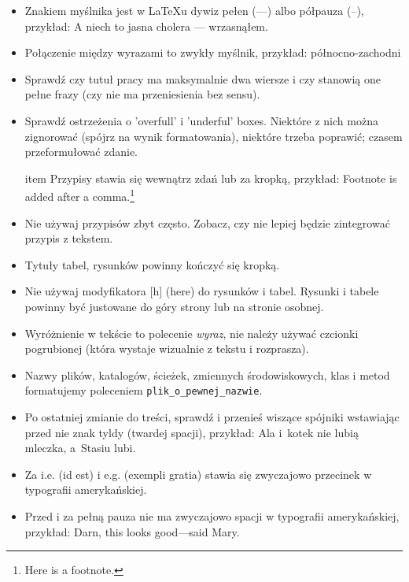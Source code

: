 \begin{itemize}
    \item Znakiem myślnika jest w LaTeXu dywiz pełen (---) albo półpauza (--), przykład:
    A niech to jasna cholera --- wrzasnąłem.

    \item Połączenie między wyrazami to zwykły myślnik, przykład:   północno-zachodni

    \item Sprawdź czy tutuł pracy ma maksymalnie dwa wiersze i czy stanowią one pełne frazy
    (czy nie ma przeniesienia bez sensu).

    \item Sprawdź ostrzeżenia o 'overfull' i 'underful' boxes. Niektóre z nich można zignorować (spójrz
    na wynik formatowania), niektóre trzeba poprawić; czasem przeformułować zdanie.

    item Przypisy stawia się wewnątrz zdań lub za kropką, przykład:
    Footnote is added after a comma.\footnote{Here is a footnote.}

    \item Nie używaj przypisów zbyt często. Zobacz, czy nie lepiej będzie zintegrować przypis z tekstem.

    \item Tytuły tabel, rysunków powinny kończyć się kropką.

    \item Nie używaj modyfikatora [h] (here) do rysunków i tabel. Rysunki i tabele powinny być
    justowane do góry strony lub na stronie osobnej.

    \item Wyróżnienie w tekście to polecenie \emph{wyraz}, nie należy używać czcionki pogrubionej (która
    wystaje wizualnie z tekstu i rozprasza).

    \item Nazwy plików, katalogów, ścieżek, zmiennych środowiskowych, klas i metod formatujemy poleceniem
    \texttt{plik\_o\_pewnej\_nazwie}.

    \item Po ostatniej zmianie do treści, sprawdź i przenieś wiszące spójniki wstawiając przed nie znak
    tyldy (twardej spacji), przykład:
    Ala i~kotek nie lubią mleczka, a~Stasiu lubi.

    \item Za i.e. (id est) i e.g. (exempli gratia) stawia się zwyczajowo przecinek w typografii amerykańskiej.

    \item Przed i za pełną pauza nie ma zwyczajowo spacji w typografii amerykańskiej, przykład:
    Darn, this looks good---said Mary.


\end{itemize}
